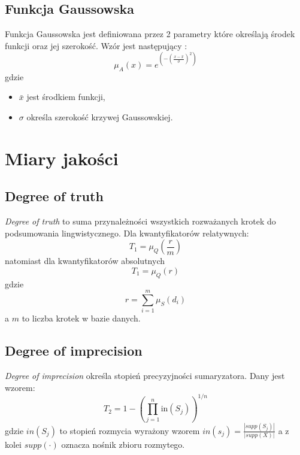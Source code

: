 \documentclass{classrep}
\begin{document}
	
	
	
	\subsection{Funkcja Gaussowska} 
	Funkcja Gaussowska jest definiowana przez 2 parametry które określają środek funkcji oraz jej szerokość. Wzór jest następujący \cite{kul}:
	\begin{equation}
		\mu_A(x) = e^{(-(\frac{x - \bar{x}}{\sigma})^2)}
	\end{equation}
	gdzie 
	\begin{itemize}
		\item $\bar{x}$ jest środkiem funkcji,
		\item $\sigma$ określa szerokość krzywej Gaussowskiej. 
	\end{itemize}
	
	\section{Miary jakości}

	\subsection{Degree of truth}
\textsl{Degree of truth} to suma przynależności wszystkich rozważanych krotek do podsumowania lingwistycznego.
	Dla kwantyfikatorów relatywnych:
	\begin{equation}
	T_1 = \mu_Q(\frac{r}{m})
	\end{equation}
natomiast dla kwantyfikatorów absolutnych
	\begin{equation}
	T_1 = \mu_Q(r)
	\end{equation}
gdzie 
	\begin{equation}
r = \sum_{i=1}^{m} \mu_{S} (d_i)
	\end{equation}
a $m$ to liczba krotek w bazie danych.


	\subsection{Degree of imprecision}
\textsl{Degree of imprecision} określa stopień precyzyjności sumaryzatora. Dany jest wzorem:
	\begin{equation}
T_2 = 1 - \left(\prod_{j=1}^{n} \mathrm{in}(S_j)\right)^{1/n}
	\end{equation}
gdzie $in(S_j)$ to stopień rozmycia wyrażony wzorem
$
in(s_j) = \frac{|supp(S_j)|}{|supp(X)|}
$
a z kolei $supp(\cdot)$ oznacza nośnik zbioru rozmytego.
\end{document}
